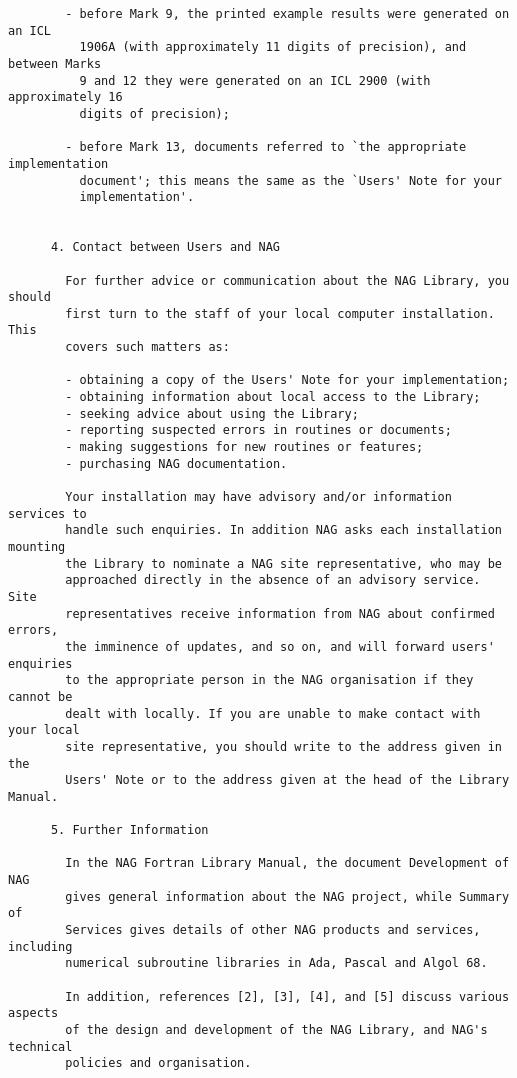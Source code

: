 \begin{small}
\begin{verbatim}
        - before Mark 9, the printed example results were generated on an ICL
          1906A (with approximately 11 digits of precision), and between Marks
          9 and 12 they were generated on an ICL 2900 (with approximately 16
          digits of precision);

        - before Mark 13, documents referred to `the appropriate implementation
          document'; this means the same as the `Users' Note for your
          implementation'.


      4. Contact between Users and NAG

        For further advice or communication about the NAG Library, you should
        first turn to the staff of your local computer installation. This
        covers such matters as:

        - obtaining a copy of the Users' Note for your implementation;
        - obtaining information about local access to the Library;
        - seeking advice about using the Library;
        - reporting suspected errors in routines or documents;
        - making suggestions for new routines or features;
        - purchasing NAG documentation.

        Your installation may have advisory and/or information services to
        handle such enquiries. In addition NAG asks each installation mounting
        the Library to nominate a NAG site representative, who may be
        approached directly in the absence of an advisory service. Site
        representatives receive information from NAG about confirmed errors,
        the imminence of updates, and so on, and will forward users' enquiries
        to the appropriate person in the NAG organisation if they cannot be
        dealt with locally. If you are unable to make contact with your local
        site representative, you should write to the address given in the
        Users' Note or to the address given at the head of the Library Manual.

      5. Further Information

        In the NAG Fortran Library Manual, the document Development of NAG
        gives general information about the NAG project, while Summary of
        Services gives details of other NAG products and services, including
        numerical subroutine libraries in Ada, Pascal and Algol 68.

        In addition, references [2], [3], [4], and [5] discuss various aspects
        of the design and development of the NAG Library, and NAG's technical
        policies and organisation.



\end{verbatim}
\end{small}
